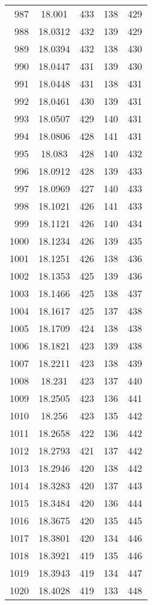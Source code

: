 \documentclass[12pt,a4paper]{article}
\begin{document}
\begin{tabular}{r|cccc}
	987 & 18.001 & 433 & 138 & 429 \\
	988 & 18.0312 & 432 & 139 & 429 \\
	989 & 18.0394 & 432 & 138 & 430 \\
	990 & 18.0447 & 431 & 139 & 430 \\
	991 & 18.0448 & 431 & 138 & 431 \\
	992 & 18.0461 & 430 & 139 & 431 \\
	993 & 18.0507 & 429 & 140 & 431 \\
	994 & 18.0806 & 428 & 141 & 431 \\
	995 & 18.083 & 428 & 140 & 432 \\
	996 & 18.0912 & 428 & 139 & 433 \\
	997 & 18.0969 & 427 & 140 & 433 \\
	998 & 18.1021 & 426 & 141 & 433 \\
	999 & 18.1121 & 426 & 140 & 434 \\
	1000 & 18.1234 & 426 & 139 & 435 \\
	1001 & 18.1251 & 426 & 138 & 436 \\
	1002 & 18.1353 & 425 & 139 & 436 \\
	1003 & 18.1466 & 425 & 138 & 437 \\
	1004 & 18.1617 & 425 & 137 & 438 \\
	1005 & 18.1709 & 424 & 138 & 438 \\
	1006 & 18.1821 & 423 & 139 & 438 \\
	1007 & 18.2211 & 423 & 138 & 439 \\
	1008 & 18.231 & 423 & 137 & 440 \\
	1009 & 18.2505 & 423 & 136 & 441 \\
	1010 & 18.256 & 423 & 135 & 442 \\
	1011 & 18.2658 & 422 & 136 & 442 \\
	1012 & 18.2793 & 421 & 137 & 442 \\
	1013 & 18.2946 & 420 & 138 & 442 \\
	1014 & 18.3283 & 420 & 137 & 443 \\
	1015 & 18.3484 & 420 & 136 & 444 \\
	1016 & 18.3675 & 420 & 135 & 445 \\
	1017 & 18.3801 & 420 & 134 & 446 \\
	1018 & 18.3921 & 419 & 135 & 446 \\
	1019 & 18.3943 & 419 & 134 & 447 \\
	1020 & 18.4028 & 419 & 133 & 448 \\

\end{tabular}
\end{document}

